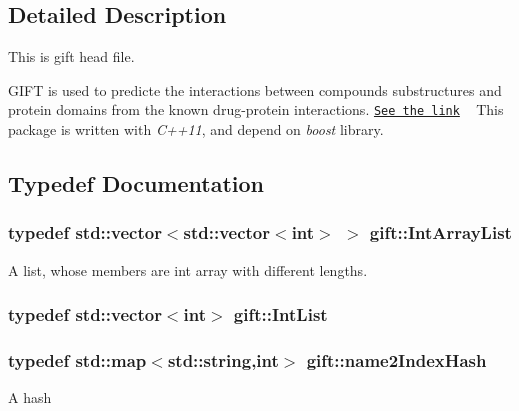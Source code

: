 \subsection{Detailed Description}
This is gift head file. 

G\+I\+FT is used to predicte the interactions between compounds substructures and protein domains from the known drug-\/protein interactions. \href{http://bioinformatics.oxfordjournals.org/content/31/15/2523.abstract}{\tt See the link} ~\newline
This package is written with {\itshape C++11}, and depend on {\itshape boost} library. 

\subsection{Typedef Documentation}
\subsubsection[{\texorpdfstring{Int\+Array\+List}{IntArrayList}}]{\setlength{\rightskip}{0pt plus 5cm}typedef std\+::vector$<$std\+::vector$<$int$>$ $>$ {\bf gift\+::\+Int\+Array\+List}}\hypertarget{namespacegift_a98b589c33d80e413fceaf8afd8e25815}{}\label{namespacegift_a98b589c33d80e413fceaf8afd8e25815}
A list, whose members are int array with different lengths. 
\subsubsection[{\texorpdfstring{Int\+List}{IntList}}]{\setlength{\rightskip}{0pt plus 5cm}typedef std\+::vector$<$int$>$ {\bf gift\+::\+Int\+List}}\hypertarget{namespacegift_a786390fe70b2e3b6d61dba1014651f03}{}\label{namespacegift_a786390fe70b2e3b6d61dba1014651f03}
\subsubsection[{\texorpdfstring{name2\+Index\+Hash}{name2IndexHash}}]{\setlength{\rightskip}{0pt plus 5cm}typedef std\+::map$<$std\+::string,int$>$ {\bf gift\+::name2\+Index\+Hash}}\hypertarget{namespacegift_a88a96011620ed18b8321bc36a816773c}{}\label{namespacegift_a88a96011620ed18b8321bc36a816773c}
A hash

